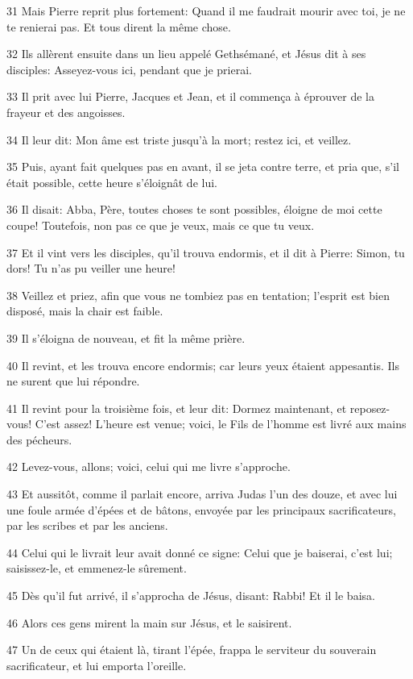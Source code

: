 \par 31 Mais Pierre reprit plus fortement: Quand il me faudrait mourir avec toi, je ne te renierai pas. Et tous dirent la même chose.
\par 32 Ils allèrent ensuite dans un lieu appelé Gethsémané, et Jésus dit à ses disciples: Asseyez-vous ici, pendant que je prierai.
\par 33 Il prit avec lui Pierre, Jacques et Jean, et il commença à éprouver de la frayeur et des angoisses.
\par 34 Il leur dit: Mon âme est triste jusqu'à la mort; restez ici, et veillez.
\par 35 Puis, ayant fait quelques pas en avant, il se jeta contre terre, et pria que, s'il était possible, cette heure s'éloignât de lui.
\par 36 Il disait: Abba, Père, toutes choses te sont possibles, éloigne de moi cette coupe! Toutefois, non pas ce que je veux, mais ce que tu veux.
\par 37 Et il vint vers les disciples, qu'il trouva endormis, et il dit à Pierre: Simon, tu dors! Tu n'as pu veiller une heure!
\par 38 Veillez et priez, afin que vous ne tombiez pas en tentation; l'esprit est bien disposé, mais la chair est faible.
\par 39 Il s'éloigna de nouveau, et fit la même prière.
\par 40 Il revint, et les trouva encore endormis; car leurs yeux étaient appesantis. Ils ne surent que lui répondre.
\par 41 Il revint pour la troisième fois, et leur dit: Dormez maintenant, et reposez-vous! C'est assez! L'heure est venue; voici, le Fils de l'homme est livré aux mains des pécheurs.
\par 42 Levez-vous, allons; voici, celui qui me livre s'approche.
\par 43 Et aussitôt, comme il parlait encore, arriva Judas l'un des douze, et avec lui une foule armée d'épées et de bâtons, envoyée par les principaux sacrificateurs, par les scribes et par les anciens.
\par 44 Celui qui le livrait leur avait donné ce signe: Celui que je baiserai, c'est lui; saisissez-le, et emmenez-le sûrement.
\par 45 Dès qu'il fut arrivé, il s'approcha de Jésus, disant: Rabbi! Et il le baisa.
\par 46 Alors ces gens mirent la main sur Jésus, et le saisirent.
\par 47 Un de ceux qui étaient là, tirant l'épée, frappa le serviteur du souverain sacrificateur, et lui emporta l'oreille.
